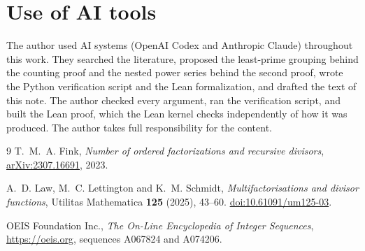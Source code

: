 \documentclass[11pt,letterpaper]{article}
\begin{document}
\section*{Use of AI tools}

The author used AI systems (OpenAI Codex and Anthropic Claude) throughout
this work. They searched the literature, proposed the least-prime grouping
behind the counting proof and the nested power series behind the second
proof, wrote the Python verification script and the Lean formalization, and
drafted the text of this note. The author checked every argument, ran the
verification script, and built the Lean proof, which the Lean kernel checks
independently of how it was produced. The author takes full responsibility
for the content.

\begin{thebibliography}{9}
 T.~M.~A. Fink,
\emph{Number of ordered factorizations and recursive divisors},
\href{https://arxiv.org/abs/2307.16691}{arXiv:2307.16691}, 2023.

 A.~D. Law, M.~C. Lettington and K.~M. Schmidt,
\emph{Multifactorisations and divisor functions}, Utilitas Mathematica
\textbf{125} (2025), 43--60.
\href{https://doi.org/10.61091/um125-03}{doi:10.61091/um125-03}.

 OEIS Foundation Inc., \emph{The On-Line Encyclopedia of
Integer Sequences}, \url{https://oeis.org}, sequences A067824 and A074206.
\end{thebibliography}
\end{document}
